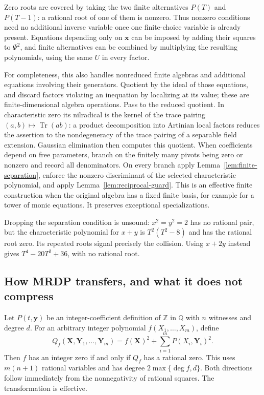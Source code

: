 Zero roots are covered by taking the two finite alternatives $P(T)$
and $P(T-1)$: a rational root of one of them is nonzero. Thus nonzero
conditions need no additional inverse variable once one finite-choice
variable is already present. Equations depending only on $\mathbf x$
can be imposed by adding their squares to $\Psi^2$, and finite alternatives
can be combined by multiplying the resulting polynomials, using the
same $U$ in every factor.

For completeness, this also handles nonreduced finite algebras and
additional equations involving their generators. Quotient by the ideal
of those equations, and discard factors violating an inequation by
localizing at its value; these are finite-dimensional algebra operations.
Pass to the reduced quotient. In characteristic zero its nilradical is
the kernel of the trace pairing $(a,b)\mapsto\operatorname{Tr}(ab)$:
a product decomposition into Artinian local factors reduces the assertion
to the nondegeneracy of the trace pairing of a separable field extension.
Gaussian elimination then computes this quotient. When coefficients depend
on free parameters, branch on the finitely many pivots being zero or
nonzero and record all denominators. On every branch apply
Lemma~\ref{lem:finite-separation}, enforce the nonzero discriminant of
the selected characteristic polynomial, and apply
Lemma~\ref{lem:reciprocal-guard}. This is an effective finite construction
when the original algebra has a fixed finite basis, for example for a
tower of monic equations. It preserves exceptional specializations.

Dropping the separation condition is unsound: $x^2=y^2=2$ has no
rational pair, but the characteristic polynomial for $x+y$ is
$T^2(T^2-8)$ and has the rational root zero. Its repeated roots signal
precisely the collision. Using $x+2y$ instead gives
$T^4-20T^2+36$, with no rational root.

\subsection{How MRDP transfers, and what it does not compress}

Let $P(t,\mathbf y)$ be an integer-coefficient definition of $\mathbb Z$
in $\mathbb Q$ with $n$ witnesses and degree $d$. For an arbitrary
integer polynomial $f(X_1,\ldots,X_m)$, define
\[
 Q_f(\mathbf X,\mathbf Y_1,\ldots,\mathbf Y_m)=
 f(\mathbf X)^2+\sum_{i=1}^mP(X_i,\mathbf Y_i)^2.
\]
Then $f$ has an integer zero if and only if $Q_f$ has a rational zero.
This uses $m(n+1)$ rational variables and has degree
$2\max\{\deg f,d\}$. Both directions follow immediately from the
nonnegativity of rational squares. The transformation is effective.

